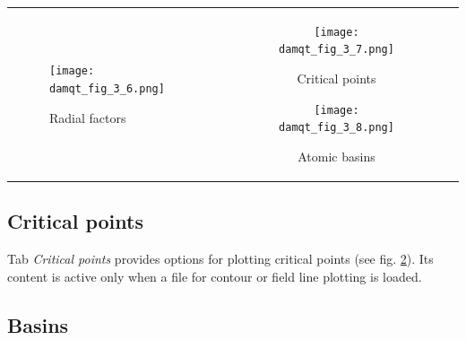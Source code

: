 \documentclass[10pt]{article}
\begin{document}
\begin{tabular}{lcr}
\begin{minipage}{.3\linewidth}
\begin{figure}[H]
    \begin{center}
        \texttt{[image: damqt\_fig\_3\_6.png]}
    \end{center}
    \caption{Radial factors \label{fig:3_6}}
\end{figure}
\end{minipage}
&
\begin{minipage}{.3\linewidth}
\begin{figure}[H]
    \begin{center}
        \texttt{[image: damqt\_fig\_3\_7.png]}
    \end{center}
    \vspace*{2mm}
    \caption{Critical points \label{fig:3_7}}
\end{figure}
\end{minipage}
\begin{minipage}{.3\linewidth}
\begin{figure}[H]
    \begin{center}
        \texttt{[image: damqt\_fig\_3\_8.png]}
    \end{center}
    \vspace*{10mm}
    \caption{Atomic basins \label{fig:3_8}}
\end{figure}
\end{minipage}
\end{tabular}



\subsection{Critical points \label{sec:3.5}}

Tab {\it Critical points} provides options for plotting critical points  
(see fig. \ref{fig:3_7}). Its content is active only when a file  
for contour or field line plotting is loaded.  

\subsection{Basins \label{sec:3.6}}
\end{document}
